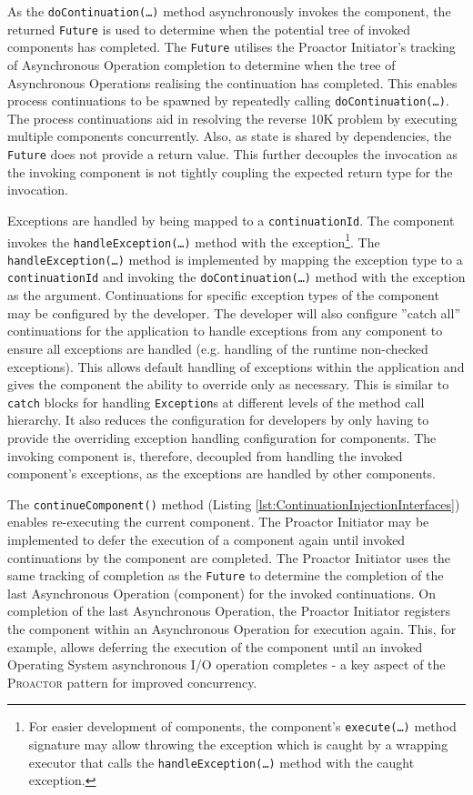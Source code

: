\documentclass[prodmode]{style/acmlarge}
\begin{document}
As the \texttt{doContinuation(\ldots)} method asynchronously invokes the
component, the returned \texttt{Future} is used to determine when the potential
tree of invoked components has completed.  The \texttt{Future} utilises the
Proactor Initiator's tracking of Asynchronous Operation completion to determine
when the tree of Asynchronous Operations realising the continuation has
completed.  This enables process continuations \cite{process-continuation} to be
spawned by repeatedly calling \texttt{doContinuation(\ldots)}.  The process
continuations aid in resolving the reverse 10K problem
\cite{reverse-ten-k-problem} by executing multiple components concurrently.
Also, as state is shared by dependencies, the \texttt{Future} does not provide a
return value.  This further decouples the invocation as the invoking component
is not tightly coupling the expected return type for the invocation.

Exceptions are handled by being mapped to a \texttt{continuationId}.  The
component invokes the \texttt{handle\-Excep\-tion(\ldots)} method with the
exception\footnote{For easier development of components, the component's
\texttt{execute(\ldots)} method signature may allow throwing the exception which
is caught by a wrapping executor that calls the \texttt{handleException(\ldots)}
method with the caught exception.}.  The \texttt{handleException(\ldots)} method
is implemented by mapping the exception type to a \texttt{continuationId} and
invoking the \texttt{doContinuation(\ldots)} method with the exception as the
argument.  Continuations for specific exception types of the component may be
configured by the developer.  The developer will also configure ''catch all''
continuations for the application to handle exceptions from any component to
ensure all exceptions are handled (e.g. handling of the runtime non-checked
exceptions).  This allows default handling of exceptions within the application
and gives the component the ability to override only as necessary.  This is
similar to \texttt{catch} blocks for handling \texttt{Exception}s at different
levels of the method call hierarchy.  It also reduces the configuration for
developers by only having to provide the overriding exception handling
configuration for components.  The invoking component is, therefore, decoupled
from handling the invoked component's exceptions, as the exceptions are handled
by other components.

The \texttt{continueComponent()} method (Listing
\ref{lst:ContinuationInjectionInterfaces}) enables re-executing the current
component.  The Proactor Initiator may be implemented to defer the execution of a
component again until invoked continuations by the component are completed.
 The Proactor Initiator uses the same tracking of completion as the
\texttt{Future} to determine the completion of the last Asynchronous Operation
(component) for the invoked continuations.  On completion of the last
Asynchronous Operation, the Proactor Initiator registers the component within an
Asynchronous Operation for execution again.  This, for example, allows deferring
the execution of the component until an invoked Operating System asynchronous
I/O operation completes - a key aspect of the \textsc{Proactor} pattern for
improved concurrency.
\end{document}
